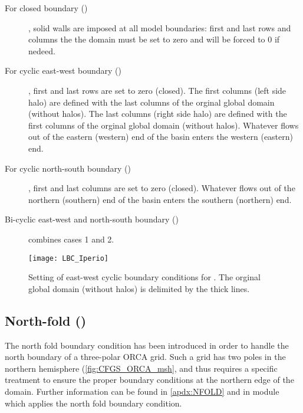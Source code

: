\documentclass[../main/NEMO_manual]{subfiles}
\begin{document}
\begin{description}

\item [For closed boundary ()], solid walls are imposed at all model boundaries: first and last rows and columns the the domain must be set to zero and will be forced to 0 if nedeed.

\item [For cyclic east-west boundary ()], first and last rows are set to zero (closed). The first  columns (left side halo) are defined with the last  columns of the orginal global domain (without halos). The last  columns (right side halo) are defined with the first  columns of the orginal global domain (without halos). Whatever flows out of the eastern (western) end of the basin enters the western (eastern) end.

\item [For cyclic north-south boundary ()], first and last columns are set to zero (closed). Whatever flows out of the northern (southern) end of the basin enters the southern (northern) end.

\item [Bi-cyclic east-west and north-south boundary ()] combines cases 1 and 2.

\end{description}

\begin{figure}[!t]
  \centering
  \texttt{[image: LBC\_Iperio]}
  \caption{Setting of east-west cyclic boundary conditions for . The orginal global domain (without halos) is delimited by the thick lines.}
  \label{fig:LBC_Iperio}
\end{figure}

\subsection{North-fold ()}
\label{subsec:LBC_north_fold}

The north fold boundary condition has been introduced in order to handle the north boundary of
a three-polar ORCA grid.
Such a grid has two poles in the northern hemisphere (\autoref{fig:CFGS_ORCA_msh},
and thus requires a specific treatment to ensure the proper boundary conditions at the northern edge of the domain.
Further information can be found in \autoref{apdx:NFOLD} and in  module which applies the north fold boundary condition.
\end{document}
